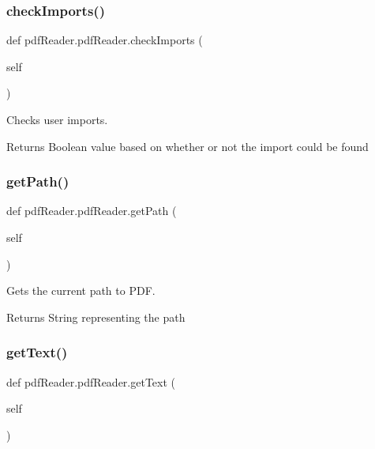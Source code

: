 \subsubsection{\texorpdfstring{check\+Imports()}{checkImports()}}
{\footnotesize\ttfamily def pdf\+Reader.\+pdf\+Reader.\+check\+Imports (\begin{DoxyParamCaption}\item[{}]{self }\end{DoxyParamCaption})}



Checks user imports. 

\begin{DoxyReturn}{Returns}
Boolean value based on whether or not the import could be found 
\end{DoxyReturn}
\mbox{\label{classpdfReader_1_1pdfReader_a9d2b2ef52976b93dfac3a5aecf0bebb8}} 
\subsubsection{\texorpdfstring{get\+Path()}{getPath()}}
{\footnotesize\ttfamily def pdf\+Reader.\+pdf\+Reader.\+get\+Path (\begin{DoxyParamCaption}\item[{}]{self }\end{DoxyParamCaption})}



Gets the current path to P\+DF. 

\begin{DoxyReturn}{Returns}
String representing the path 
\end{DoxyReturn}
\mbox{\label{classpdfReader_1_1pdfReader_acaff69d078984de8dce0e23198e0e83a}} 
\subsubsection{\texorpdfstring{get\+Text()}{getText()}}
{\footnotesize\ttfamily def pdf\+Reader.\+pdf\+Reader.\+get\+Text (\begin{DoxyParamCaption}\item[{}]{self }\end{DoxyParamCaption})}



